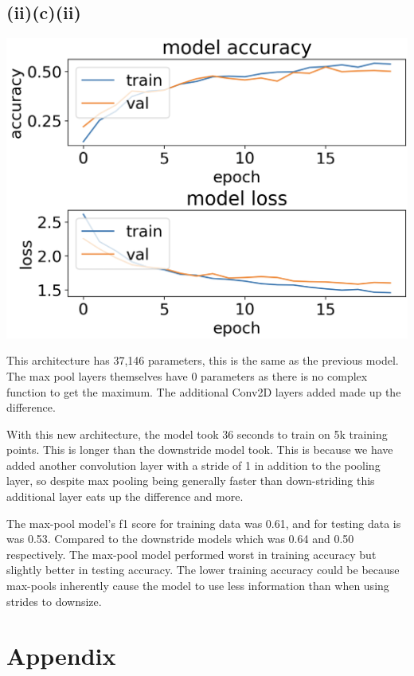 \documentclass{article}
\begin{document}
\subsection{(ii)(c)(ii)}
\begin{center}
\includegraphics[width=.8\linewidth]{pool.png}
\end{center}

This architecture has 37,146 parameters, this is the same as the previous model. The max pool layers themselves have 0 parameters as there is no complex function to get the maximum. The additional Conv2D layers added made up the difference.

With this new architecture, the model took 36 seconds to train on 5k training points. This is longer than the downstride model took. This is because we have added another convolution layer with a stride of 1 in addition to the pooling layer, so despite max pooling being generally faster than down-striding this additional layer eats up the difference and more.

The max-pool model's f1 score for training data was 0.61, and for testing data is was 0.53. Compared to the downstride models which was 0.64 and 0.50 respectively. The max-pool model performed worst in training accuracy but slightly better in testing accuracy. The lower training accuracy could be because max-pools inherently cause the model to use less information than when using strides to downsize.

\section{Appendix}

\end{document}
